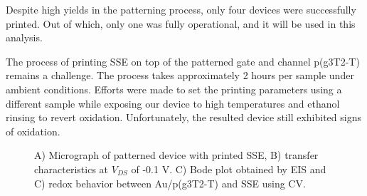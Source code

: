 Despite high yields in the patterning process, only four devices were successfully printed. Out of which, only one was fully operational, and it will be used in this analysis.

The process of printing SSE on top of the patterned gate and channel p(g3T2-T) remains a challenge. The process takes approximately 2 hours per sample under ambient conditions. Efforts were made to set the printing parameters using a different sample while exposing our device to high temperatures and ethanol rinsing to revert oxidation. Unfortunately, the resulted device still exhibited signs of oxidation.

\begin{figure}[ht]
    \centering
    \qquad
    \caption[Performance of solid-OECT with printed SSE]{A) Micrograph of patterned device with printed SSE, B) transfer characteristics at $V_{DS}$ of -0.1 V. C) Bode plot obtained by EIS and C) redox behavior between Au/p(g3T2-T) and SSE using CV.}
    \label{fig:printedSSE}
\end{figure}



